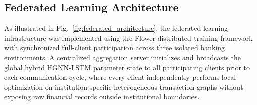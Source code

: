 \documentclass[conference]{IEEEtran}
\begin{document}
\subsection{\textbf{Federated Learning Architecture}}

As illustrated in Fig.~\ref{fig:federated_architecture}, the federated learning infrastructure was implemented using the Flower distributed training framework with synchronized full-client participation across three isolated banking environments. A centralized aggregation server initializes and broadcasts the global hybrid HGNN-LSTM parameter state to all participating clients prior to each communication cycle, where every client independently performs local optimization on institution-specific heterogeneous transaction graphs without exposing raw financial records outside institutional boundaries.
\end{document}
